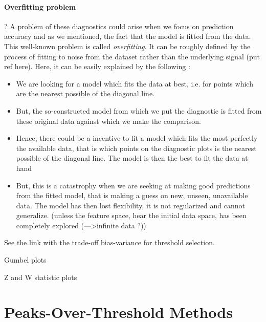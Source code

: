 \documentclass[11pt,a4paper,openany ]{book}
\begin{document}
\subsubsection*{Overfitting problem} \cite{northrop_cross_2016}?
A problem of these diagnostics could arise when we focus on prediction accuracy and as we mentioned, the fact that the model is fitted from the data. This well-known problem is called \emph{overfitting}. It can be roughly defined by the process of fitting to noise from the dataset rather than the underlying signal (put ref here). Here, it can be easily explained by the following :
\begin{itemize}
	
	\item We are looking for a model which fits the data at best, i.e. for points which are the nearest possible of the diagonal line.
	
	\item But, the so-constructed model from which we put the diagnostic is fitted from these original data against which we make the comparison.
	
	\item Hence, there could be a incentive to fit a model which fits the most perfectly the available data, that is which points on the diagnostic plots is the nearest possible of the diagonal line. The model is then the best to fit the data at hand
	
	\item But, this is a catastrophy when we are seeking at making good predictions from the fitted model, that is making a guess on new, unseen, unavailable data. The model has then lost flexibility, it is not regularized and cannot generalize. (unless the feature space, hear the initial data space, has been completely explored (--->infinite data ?))
\end{itemize}
See the link with the trade-off bias-variance for threshold selection.



Gumbel plots

Z and W statistic plots



\chapter{Peaks-Over-Threshold Methods}\label{sec::2}
\vspace{-1cm}
\minitoc \thispagestyle{empty}
 \vspace{1.5cm}
\end{document}
